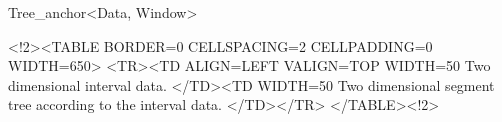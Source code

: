\begin{ccRefClass}{Tree_anchor<Data, Window>}
\begin{ccHtmlOnly}
        <!2><TABLE BORDER=0 CELLSPACING=2 CELLPADDING=0 WIDTH=650>
        <TR><TD ALIGN=LEFT VALIGN=TOP WIDTH=50%
Two dimensional interval data.
 </TD><TD WIDTH=50%
Two dimensional segment tree
  according to the interval data.
 </TD></TR>
        </TABLE><!2>
\end{ccHtmlOnly}
\end{ccRefClass}
